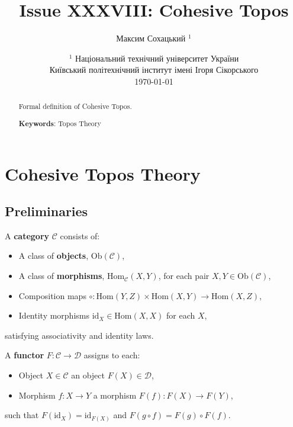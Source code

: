 \documentclass{article}
\begin{document}
\title{Issue XXXVIII: Cohesive Topos}
\author{Максим Сохацький $^1$}
\date{ $^1$ Національний технічний університет України \\
       \small Київський політехнічний інститут імені Ігоря Сікорського \\
       \today }

\maketitle

\begin{abstract}

Formal definition of Cohesive Topos.

{\bf Keywords}: Topos Theory \\
\end{abstract}

\ifincludeTOC
  \tableofcontents
\fi

\section{Cohesive Topos Theory}

\subsection{Preliminaries}
A \textbf{category} $\mathcal{C}$ consists of:
\begin{itemize}
  \item A class of \textbf{objects}, $\mathrm{Ob}(\mathcal{C})$,
  \item A class of \textbf{morphisms}, $\mathrm{Hom}_{\mathcal{C}}(X,Y)$, for each pair $X,Y \in \mathrm{Ob}(\mathcal{C})$,
  \item Composition maps $\circ: \mathrm{Hom}(Y,Z) \times \mathrm{Hom}(X,Y) \to \mathrm{Hom}(X,Z)$,
  \item Identity morphisms $\mathrm{id}_X \in \mathrm{Hom}(X,X)$ for each $X$,
\end{itemize}
satisfying associativity and identity laws.


A \textbf{functor} $F: \mathcal{C} \to \mathcal{D}$ assigns to each:
\begin{itemize}
  \item Object $X \in \mathcal{C}$ an object $F(X) \in \mathcal{D}$,
  \item Morphism $f: X \to Y$ a morphism $F(f): F(X) \to F(Y)$,
\end{itemize}
such that $F(\mathrm{id}_X) = \mathrm{id}_{F(X)}$ and $F(g \circ f) = F(g) \circ F(f)$.
\end{document}
